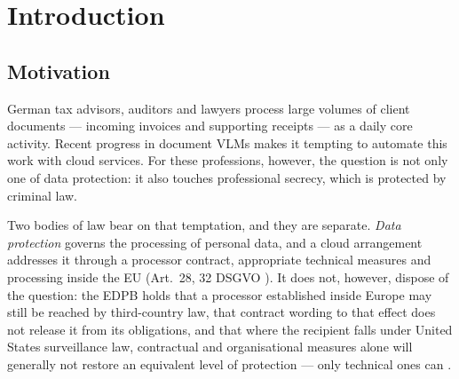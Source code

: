 \chapter{Introduction}
\label{ch:introduction}

\section{Motivation}
\label{sec:motivation}

German tax advisors, auditors and lawyers process large volumes of client
documents --- incoming invoices and supporting receipts --- as a daily core
activity. Recent progress in document \acp{VLM} makes it tempting to
automate this work with cloud services. For these professions, however, the
question is not only one of data protection: it also touches professional
secrecy, which is protected by criminal law.

Two bodies of law bear on that temptation, and they are separate.
\emph{Data protection} governs the processing of personal data, and a
cloud arrangement addresses it through a processor contract, appropriate
technical measures and processing inside the \ac{EU} (Art.~28, 32 \ac{DSGVO}
\parencite{dsgvo28,dsgvo32}). It does not, however, dispose of the question:
the \ac{EDPB} holds that a processor established inside Europe may still be
reached by third-country law, that contract wording to that effect does not
release it from its obligations, and that where the recipient falls under
United States surveillance law, contractual and organisational measures alone
will generally not restore an equivalent level of protection --- only technical
ones can \parencite{edpb2024processors,edpb2021supplementary}.

